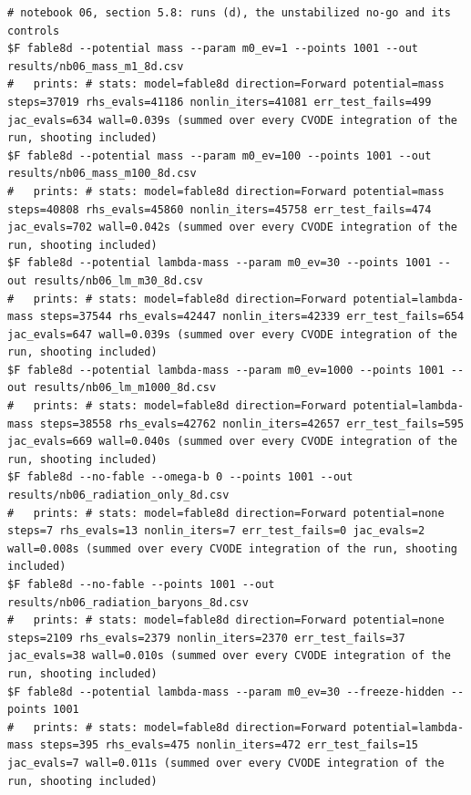 \begin{Verbatim}[fontsize=\scriptsize]
# notebook 06, section 5.8: runs (d), the unstabilized no-go and its controls
$F fable8d --potential mass --param m0_ev=1 --points 1001 --out results/nb06_mass_m1_8d.csv
#   prints: # stats: model=fable8d direction=Forward potential=mass steps=37019 rhs_evals=41186 nonlin_iters=41081 err_test_fails=499 jac_evals=634 wall=0.039s (summed over every CVODE integration of the run, shooting included)
$F fable8d --potential mass --param m0_ev=100 --points 1001 --out results/nb06_mass_m100_8d.csv
#   prints: # stats: model=fable8d direction=Forward potential=mass steps=40808 rhs_evals=45860 nonlin_iters=45758 err_test_fails=474 jac_evals=702 wall=0.042s (summed over every CVODE integration of the run, shooting included)
$F fable8d --potential lambda-mass --param m0_ev=30 --points 1001 --out results/nb06_lm_m30_8d.csv
#   prints: # stats: model=fable8d direction=Forward potential=lambda-mass steps=37544 rhs_evals=42447 nonlin_iters=42339 err_test_fails=654 jac_evals=647 wall=0.039s (summed over every CVODE integration of the run, shooting included)
$F fable8d --potential lambda-mass --param m0_ev=1000 --points 1001 --out results/nb06_lm_m1000_8d.csv
#   prints: # stats: model=fable8d direction=Forward potential=lambda-mass steps=38558 rhs_evals=42762 nonlin_iters=42657 err_test_fails=595 jac_evals=669 wall=0.040s (summed over every CVODE integration of the run, shooting included)
$F fable8d --no-fable --omega-b 0 --points 1001 --out results/nb06_radiation_only_8d.csv
#   prints: # stats: model=fable8d direction=Forward potential=none steps=7 rhs_evals=13 nonlin_iters=7 err_test_fails=0 jac_evals=2 wall=0.008s (summed over every CVODE integration of the run, shooting included)
$F fable8d --no-fable --points 1001 --out results/nb06_radiation_baryons_8d.csv
#   prints: # stats: model=fable8d direction=Forward potential=none steps=2109 rhs_evals=2379 nonlin_iters=2370 err_test_fails=37 jac_evals=38 wall=0.010s (summed over every CVODE integration of the run, shooting included)
$F fable8d --potential lambda-mass --param m0_ev=30 --freeze-hidden --points 1001
#   prints: # stats: model=fable8d direction=Forward potential=lambda-mass steps=395 rhs_evals=475 nonlin_iters=472 err_test_fails=15 jac_evals=7 wall=0.011s (summed over every CVODE integration of the run, shooting included)
\end{Verbatim}
